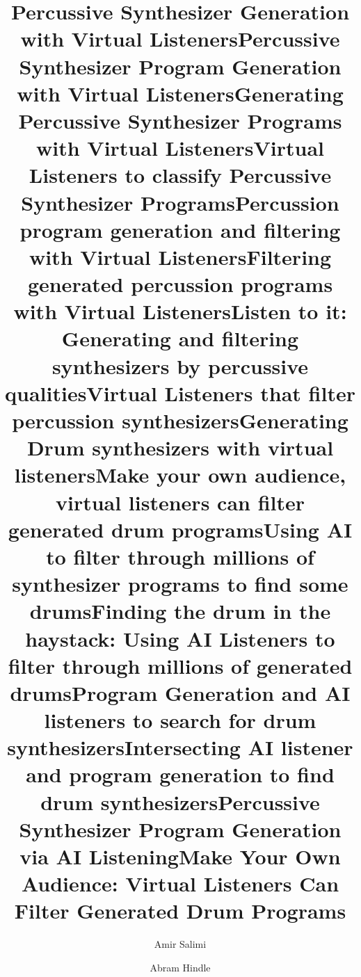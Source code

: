 \documentclass[runningheads,a4paper]{llncs}
\begin{document}
\mainmatter  

\title{Percussive Synthesizer Generation with Virtual Listeners}
\title{Percussive Synthesizer Program Generation with Virtual Listeners}
\title{Generating Percussive Synthesizer Programs with Virtual Listeners}
\title{Virtual Listeners to classify Percussive Synthesizer Programs}
\title{Percussion program generation and filtering with Virtual Listeners}
\title{Filtering generated percussion programs with Virtual Listeners}
\title{Listen to it: Generating and filtering synthesizers by percussive qualities}
\title{Virtual Listeners that filter percussion synthesizers}
\title{Generating Drum synthesizers with virtual listeners}
\title{Make your own audience, virtual listeners can filter generated drum programs}
\title{Using AI to filter through millions of synthesizer programs to find some drums}
\title{Finding the drum in the haystack: Using AI Listeners to filter through millions of generated drums}
\title{Program Generation and AI listeners to search for drum synthesizers}
\title{Intersecting AI listener and program generation to find drum synthesizers}
\title{Percussive Synthesizer Program Generation via AI Listening}
\title{Make Your Own Audience: Virtual Listeners Can Filter Generated Drum Programs}



\author{Amir Salimi \and Abram Hindle}


\maketitle
\end{document}
